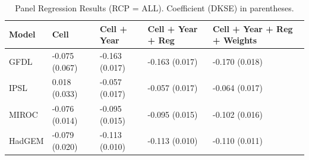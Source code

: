 \begin{table}[ht]
\centering
\begin{tabular}{lllll}
  \hline
Model & Cell & Cell + Year & Cell + Year + Reg & Cell + Year + Reg + Weights \\ 
  \hline
GFDL & -0.075
(0.067) & -0.163
(0.017) & -0.163
(0.017) & -0.170
(0.018) \\ 
  IPSL & 0.018
(0.033) & -0.057
(0.017) & -0.057
(0.017) & -0.064
(0.017) \\ 
  MIROC & -0.076
(0.014) & -0.095
(0.015) & -0.095
(0.015) & -0.102
(0.016) \\ 
  HadGEM & -0.079
(0.020) & -0.113
(0.010) & -0.113
(0.010) & -0.110
(0.011) \\ 
   \hline
\end{tabular}
\caption{Panel Regression Results (RCP = ALL). Coefficient (DKSE) in parentheses.} 
\label{tab:main_results}
\end{table}
